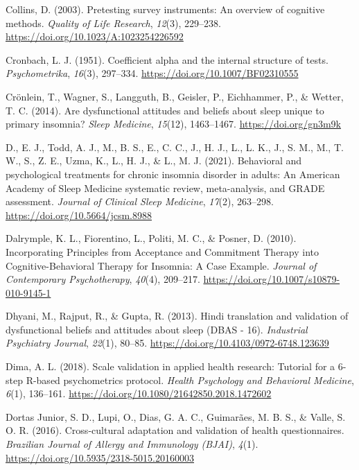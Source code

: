 \documentclass[
  ,doc,11pt, twoside,floatsintext]{apa6}
\newlength{\cslhangindent}
\newlength{\cslentryspacingunit} %
\newenvironment{CSLReferences}[2] %
 {%
  \setlength{\parindent}{0pt}
  \ifodd #1
  \let\oldpar\par
  \def\par{\hangindent=\cslhangindent\oldpar}
  \fi
  \setlength{\parskip}{#2\cslentryspacingunit}
 }%
 {}
\begin{document}
\begin{CSLReferences}{1}{0}
\leavevmode{}%
Collins, D. (2003). Pretesting survey instruments: {An} overview of cognitive methods. \emph{Quality of Life Research}, \emph{12}(3), 229--238. \url{https://doi.org/10.1023/A:1023254226592}

\leavevmode{}%
Cronbach, L. J. (1951). Coefficient alpha and the internal structure of tests. \emph{Psychometrika}, \emph{16}(3), 297--334. \url{https://doi.org/10.1007/BF02310555}

\leavevmode{}%
Crönlein, T., Wagner, S., Langguth, B., Geisler, P., Eichhammer, P., \& Wetter, T. C. (2014). Are dysfunctional attitudes and beliefs about sleep unique to primary insomnia? \emph{Sleep Medicine}, \emph{15}(12), 1463--1467. \url{https://doi.org/gn3m9k}

\leavevmode{}%
D., E. J., Todd, A. J., M., B. S., E., C. C., J., H. J., L., L. K., J., S. M., M., T. W., S., Z. E., Uzma, K., L., H. J., \& L., M. J. (2021). Behavioral and psychological treatments for chronic insomnia disorder in adults: An {American Academy} of {Sleep Medicine} systematic review, meta-analysis, and {GRADE} assessment. \emph{Journal of Clinical Sleep Medicine}, \emph{17}(2), 263--298. \url{https://doi.org/10.5664/jcsm.8988}

\leavevmode{}%
Dalrymple, K. L., Fiorentino, L., Politi, M. C., \& Posner, D. (2010). Incorporating {Principles} from {Acceptance} and {Commitment Therapy} into {Cognitive-Behavioral Therapy} for {Insomnia}: {A Case Example}. \emph{Journal of Contemporary Psychotherapy}, \emph{40}(4), 209--217. \url{https://doi.org/10.1007/s10879-010-9145-1}

\leavevmode{}%
Dhyani, M., Rajput, R., \& Gupta, R. (2013). Hindi translation and validation of dysfunctional beliefs and attitudes about sleep ({DBAS} - 16). \emph{Industrial Psychiatry Journal}, \emph{22}(1), 80--85. \url{https://doi.org/10.4103/0972-6748.123639}

\leavevmode{}%
Dima, A. L. (2018). Scale validation in applied health research: Tutorial for a 6-step {R-based} psychometrics protocol. \emph{Health Psychology and Behavioral Medicine}, \emph{6}(1), 136--161. \url{https://doi.org/10.1080/21642850.2018.1472602}

\leavevmode{}%
Dortas Junior, S. D., Lupi, O., Dias, G. A. C., Guimarães, M. B. S., \& Valle, S. O. R. (2016). {Cross-cultural adaptation and validation of health questionnaires}. \emph{Brazilian Journal of Allergy and Immunology (BJAI)}, \emph{4}(1). \url{https://doi.org/10.5935/2318-5015.20160003}


\end{CSLReferences}
\end{document}
